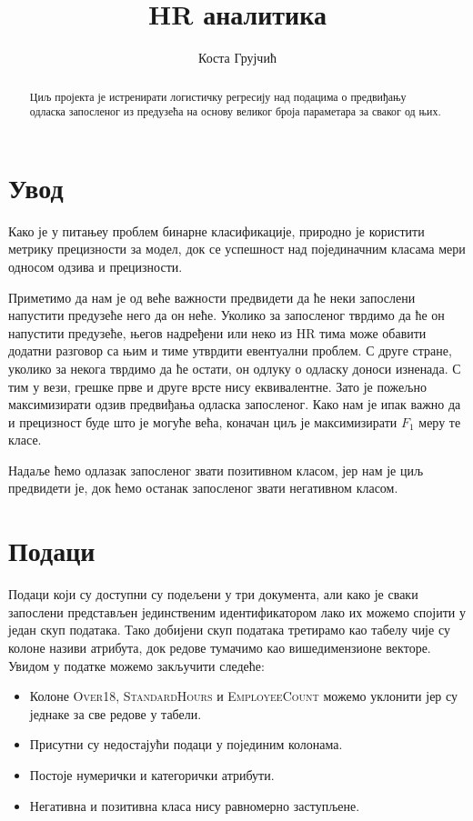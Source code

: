 \documentclass[12pt, a4paper]{article}
\begin{document}
\date{}
\title{HR аналитика}
\author{Коста Грујчић}
\maketitle

\begin{abstract}
	Циљ пројекта је истренирати логистичку регресију над подацима о предвиђању одласка запосленог из предузећа на основу великог броја параметара за сваког од њих.
\end{abstract}

\section{Увод}
	Како је у питањеу проблем бинарне класификације, природно је користити метрику прецизности за модел, док се успешност над појединачним класама мери односом одзива и прецизности.
	
	Приметимо да нам је од веће важности предвидети да ће неки запослени напустити предузеће него да он неће. Уколико за запосленог тврдимо да ће он напустити предузеће, његов надређени или неко из HR тима може обавити додатни разговор са њим и тиме утврдити евентуални проблем. С друге стране, уколико за некога тврдимо да ће остати, он одлуку о одласку доноси изненада. С тим у вези, грешке прве и друге врсте нису еквивалентне. Зато је пожељно максимизирати одзив предвиђања одласка запосленог. Како нам је ипак важно да и прецизност буде што је могуће већа, коначан циљ је максимизирати $F_1$ меру те класе.
	
	Надаље ћемо одлазак запосленог звати позитивном класом, јер нам је циљ предвидети је, док ћемо останак запосленог звати негативном класом.

\section{Подаци}
	Подаци који су доступни су подељени у три документа, али како је сваки запослени представљен јединственим идентификатором лако их можемо спојити у један скуп података. Тако добијени скуп података третирамо као табелу чије су колоне називи атрибута, док редове тумачимо као вишедимензионе векторе. Увидом у податке можемо закључити следеће:
	
	\begin{itemize}
		\item Колоне \textsc{Over18}, \textsc{StandardHours} и \textsc{EmployeeCount} можемо уклонити јер су једнаке за све редове у табели.
		\item Присутни су недостајући подаци у појединим колонама.
		\item Постоје нумерички и категорички атрибути.
		\item Негативна и позитивна класа нису равномерно заступљене.
	\end{itemize}
	
\end{document}
